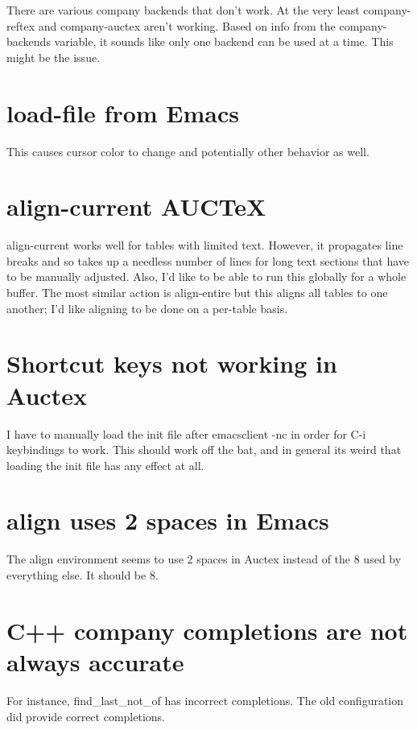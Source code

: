 \documentclass{default}
\begin{document}
There are various company backends that don't work. At the very least company-reftex and
company-auctex aren't working. Based on info from the company-backends variable, it sounds like only
one backend can be used at a time. This might be the issue.

\section{load-file from Emacs}

This causes cursor color to change and potentially other behavior as well.

\section{align-current AUCTeX}

align-current works well for tables with limited text. However, it propagates line breaks and so
takes up a needless number of lines for long text sections that have to be manually adjusted. Also,
I'd like to be able to run this globally for a whole buffer. The most similar action is align-entire
but this aligns all tables to one another; I'd like aligning to be done on a per-table basis.

\section{Shortcut keys not working in Auctex}

I have to manually load the init file after emacsclient -nc in order for C-i keybindings to
work. This should work off the bat, and in general its weird that loading the init file has any
effect at all.

\section{align uses 2 spaces in Emacs}

The align environment seems to use 2 spaces in Auctex instead of the 8 used by everything else. It
should be 8.

\section{C++ company completions are not always accurate}

For instance, find_last_not_of has incorrect completions. The old configuration did provide correct
completions.
\end{document}
